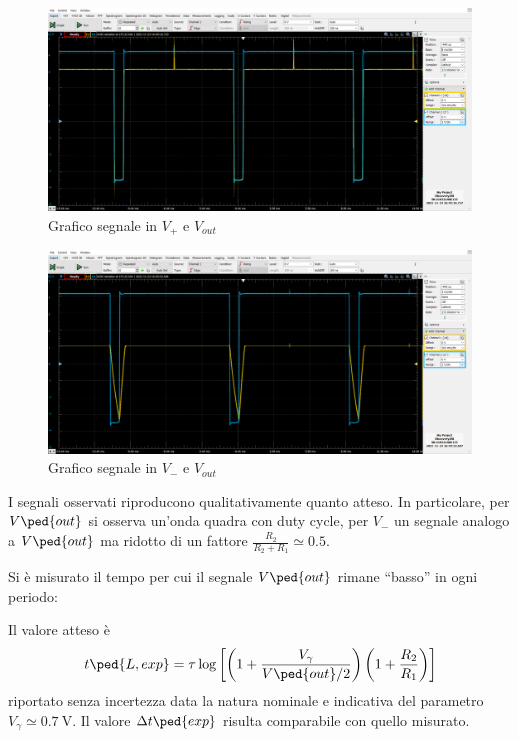 \documentclass[10pt,a4paper]{article}
\begin{document}
\begin{figure}[htbp]
\centering
\includegraphics[scale=0.42]{monostabileV+}
\caption{Grafico segnale in $V_+$ e $V_{out}$}
\end{figure}

\begin{figure}[htbp]
\centering
\includegraphics[scale=0.42]{monostabileV-}
\caption{Grafico segnale in $V_-$ e $V_{out}$}
\end{figure}

I segnali osservati riproducono qualitativamente quanto atteso.
In particolare, per $ V \ped{out} $ si osserva un'onda quadra con duty cycle,
per $ V_{-} $ un segnale analogo a $ V\ped{out} $ ma ridotto di un fattore
$\frac{R_2}{R_2 + R_1} \simeq 0.5 $.

Si è misurato il tempo per cui il segnale $ V \ped{out} $ rimane ``basso'' in ogni periodo:

Il valore atteso è
\begin{equation} \label{eq: mstabile}
t\ped{L, exp} =
\tau \log\left[\left(1 + \frac{V_\gamma}{V \ped{out}/2}\right)
\left(1 + \frac{R_2}{R_1}\right)\right]
\end{equation}
riportato senza incertezza data la natura nominale e indicativa del parametro $ V_{\gamma} \simeq \SI{0.7}{\volt} $. Il valore $ \Delta t \ped{exp} $ risulta comparabile con quello misurato.
\end{document}
